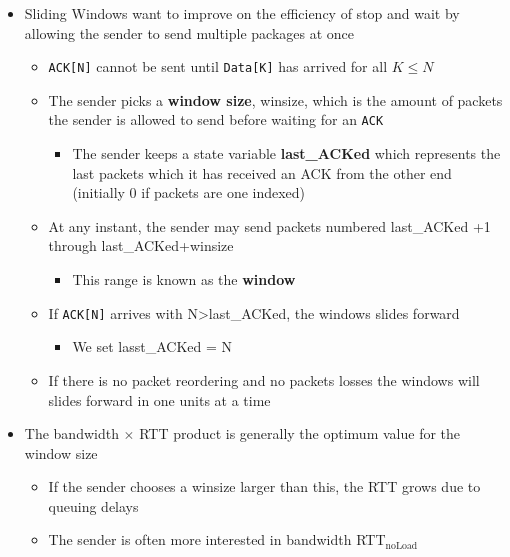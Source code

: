 \documentclass[11pt]{article}
\providecommand{\tightlist}{%
      \setlength{\itemsep}{0pt}\setlength{\parskip}{0pt}}
\begin{document}
\begin{itemize}
\tightlist
\item
  Sliding Windows want to improve on the efficiency of stop and wait by
  allowing the sender to send multiple packages at once

  \begin{itemize}
  \tightlist
  \item
    \texttt{ACK{[}N{]}} cannot be sent until \texttt{Data{[}K{]}} has
    arrived for all \(K \leq N\)
  \item
    The sender picks a \textbf{window size}, winsize, which is the
    amount of packets the sender is allowed to send before waiting for
    an \texttt{ACK}

    \begin{itemize}
    \tightlist
    \item
      The sender keeps a state variable \textbf{last\_ACKed} which
      represents the last packets which it has received an ACK from the
      other end (initially 0 if packets are one indexed)
    \end{itemize}
  \item
    At any instant, the sender may send packets numbered last\_ACKed +1
    through last\_ACKed+winsize

    \begin{itemize}
    \tightlist
    \item
      This range is known as the \textbf{window}
    \end{itemize}
  \item
    If \texttt{ACK{[}N{]}} arrives with N\textgreater{}last\_ACKed, the
    windows slides forward

    \begin{itemize}
    \tightlist
    \item
      We set lasst\_ACKed = N
    \end{itemize}
  \item
    If there is no packet reordering and no packets losses the windows
    will slides forward in one units at a time
  \end{itemize}
\item
  The bandwidth \(\times\) RTT product is generally the optimum value
  for the window size

  \begin{itemize}
  \tightlist
  \item
    If the sender chooses a winsize larger than this, the RTT grows due
    to queuing delays
  \item
    The sender is often more interested in bandwidth
    RTT\(_\text{noLoad}\)


\end{itemize}
\end{itemize}
\end{document}
